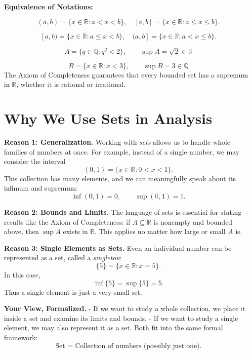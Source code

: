 \documentclass[a4paper,12pt]{article}
\begin{document}
		\bigskip
		
		\textbf{Equivalence of Notations:}
		
		\[
		(a,b) = \{x \in \mathbb{R} : a < x < b\}, \quad
		[a,b] = \{x \in \mathbb{R} : a \leq x \leq b\}.
		\]
		
		\[
		[a,b) = \{x \in \mathbb{R} : a \leq x < b\}, \quad
		(a,b] = \{x \in \mathbb{R} : a < x \leq b\}.
		\]
		
\[
A = \{q \in \mathbb{Q} : q^2 < 2\}, 
\qquad 
\boxed{\sup A = \sqrt{2} \in \mathbb{R}}
\]

\[
B = \{x \in \mathbb{R} : x < 3\}, 
\qquad 
\boxed{\sup B = 3 \in \mathbb{Q}}
\]
The Axiom of Completeness guarantees that every bounded set has a supremum in $\mathbb{R}$, whether it is rational or irrational. 

\section*{Why We Use Sets in Analysis}

\textbf{Reason 1: Generalization.}  
Working with \emph{sets} allows us to handle whole families of numbers at once.
For example, instead of a single number, we may consider the interval
\[
(0,1) = \{x \in \mathbb{R} : 0 < x < 1\}.
\]
This collection has many elements, and we can meaningfully speak about its
infimum and supremum:
\[
\inf(0,1) = 0, \qquad \sup(0,1) = 1.
\]

\bigskip

\textbf{Reason 2: Bounds and Limits.}  
The language of sets is essential for stating results like the Axiom of Completeness:
if $A \subseteq \mathbb{R}$ is nonempty and bounded above, then $\sup A$ exists in $\mathbb{R}$.
This applies no matter how large or small $A$ is.

\bigskip

\textbf{Reason 3: Single Elements as Sets.}  
Even an individual number can be represented as a set, called a \emph{singleton}:
\[
\{5\} = \{x \in \mathbb{R} : x = 5\}.
\]
In this case,
\[
\inf\{5\} = \sup\{5\} = 5.
\]
Thus a single element is just a very small set.

\bigskip

\textbf{Your View, Formalized.}  
- If we want to study a whole collection, we place it inside a set and examine its limits and bounds.  
- If we want to study a single element, we may also represent it as a set.  
Both fit into the same formal framework:
\[
\text{Set = Collection of numbers (possibly just one).}
\]
\end{document}
